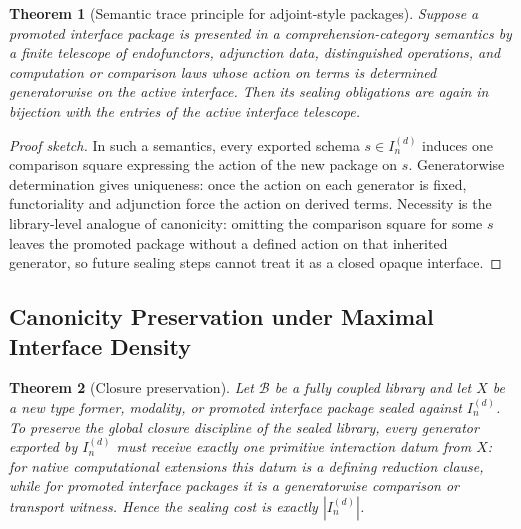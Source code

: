 \documentclass[11pt,a4paper]{article}
\theoremstyle{plain}
\newtheorem{theorem}{Theorem}[section]
\theoremstyle{definition}
\theoremstyle{remark}
\newcommand{\B}{\mathcal{B}}
\begin{document}
\begin{theorem}[Semantic trace principle for adjoint-style packages]
\label{thm:semantic-trace}
Suppose a promoted interface package is presented in a comprehension-category semantics by a finite telescope of endofunctors, adjunction data, distinguished operations, and computation or comparison laws whose action on terms is determined generatorwise on the active interface.  Then its sealing obligations are again in bijection with the entries of the active interface telescope.
\end{theorem}

\begin{proof}[Proof sketch]
In such a semantics, every exported schema $s\in I_n^{(d)}$ induces one comparison square expressing the action of the new package on $s$.  Generatorwise determination gives uniqueness: once the action on each generator is fixed, functoriality and adjunction force the action on derived terms.  Necessity is the library-level analogue of canonicity: omitting the comparison square for some $s$ leaves the promoted package without a defined action on that inherited generator, so future sealing steps cannot treat it as a closed opaque interface.
\end{proof}

\subsection{Canonicity Preservation under Maximal Interface Density}

\begin{theorem}[Closure preservation]
\label{thm:canonicity}
Let $\B$ be a fully coupled library and let $X$ be a new type former, modality, or promoted interface package sealed against $I_n^{(d)}$.  To preserve the global closure discipline of the sealed library, every generator exported by $I_n^{(d)}$ must receive exactly one primitive interaction datum from $X$: for native computational extensions this datum is a defining reduction clause, while for promoted interface packages it is a generatorwise comparison or transport witness.  Hence the sealing cost is exactly $|I_n^{(d)}|$.
\end{theorem}
\end{document}
